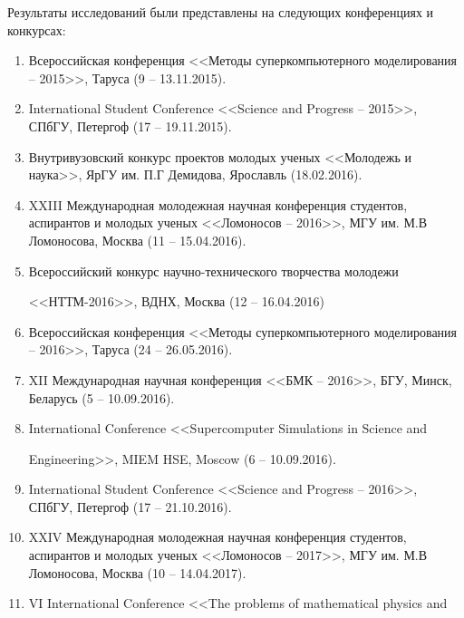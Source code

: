 \documentclass[12pt]{extarticle}
\begin{document}
Результаты исследований были представлены на следующих конференциях и конкурсах:
\begin{enumerate}[label=\arabic*),leftmargin=1.5\parindent]
\item Всероссийская конференция <<Методы суперкомпьютерного моделирования -- 2015>>, Таруса (9 -- 13.11.2015).
\item International Student Conference <<Science and Progress -- 2015>>, СПбГУ, Петергоф (17 -- 19.11.2015).
\item Внутривузовский конкурс проектов молодых ученых <<Молодежь и наука>>, ЯрГУ им. П.Г Демидова, Ярославль (18.02.2016).
\item XXIII Международная молодежная научная конференция студентов, аспирантов и молодых ученых <<Ломоносов -- 2016>>, МГУ им. М.В Ломоносова, Москва (11 -- 15.04.2016).
\item Всероссийский конкурс научно-технического творчества молодежи 

\vspace{-0.2cm}
<<НТТМ-2016>>, ВДНХ, Москва (12 -- 16.04.2016)
\item Всероссийская конференция <<Методы суперкомпьютерного моделирования -- 2016>>, Таруса (24 -- 26.05.2016).
\item XII Международная научная конференция <<БМК -- 2016>>, БГУ, Минск, Беларусь (5 -- 10.09.2016).
\item International Conference <<Supercomputer Simulations in Science and 

\vspace{-0.2cm}
Engineering>>, MIEM HSE, Moscow (6 -- 10.09.2016).
\item International Student Conference <<Science and Progress -- 2016>>, СПбГУ, Петергоф (17 -- 21.10.2016).
\item XXIV Международная молодежная научная конференция студентов, аспирантов и молодых ученых <<Ломоносов -- 2017>>, МГУ им. М.В Ломоносова, Москва (10 -- 14.04.2017).
\item VI International Conference <<The problems of mathematical physics and 


\end{enumerate}
\end{document}
